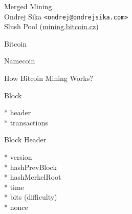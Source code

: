 \documentclass{beamer}
\begin{document}
\Large
\begin{frame}

    {\Huge Merged Mining}\\
    \vspace{7mm}
    {\LARGE Ondrej Sika \lstinline|<ondrej@ondrejsika.com>|}\\
    \vspace{7mm}
    {\Large Slush Pool (\url{mining.bitcoin.cz})}\\

\end{frame}

\begin{frame}

    {\Huge Bitcoin}\\

\end{frame}

\begin{frame}

    {\Huge Namecoin}\\

\end{frame}

\begin{frame}

    {\Huge How Bitcoin Mining Works?}\\

\end{frame}

\begin{frame}

    {\Huge Block}\\

    \vspace{5mm}

    * header\\
    * transactions\\


\end{frame}

\begin{frame}

    {\Huge Block Header}\\

    \vspace{5mm}

    * version\\
    * hashPrevBlock\\
    * hashMerkelRoot\\
    * time\\
    * bits (difficulty)\\
    * nonce\\

\end{frame}
\end{document}
